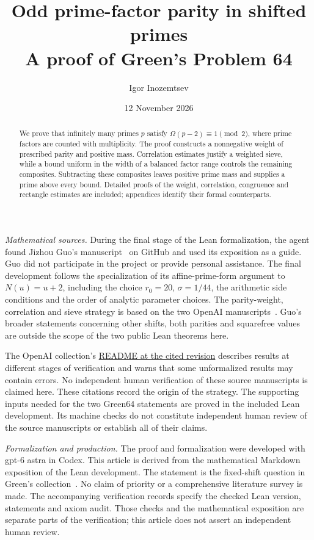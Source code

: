 \documentclass[11pt,a4paper]{article}
\title{Odd prime-factor parity in shifted primes\\[0.3em]
  \large A proof of Green's Problem 64}
\author{Igor Inozemtsev}
\date{12 November 2026}
\begin{document}
\maketitle
\begin{abstract}
We prove that infinitely many primes $p$ satisfy $\Omega(p-2)\equiv1\pmod2$,
where prime factors are counted with multiplicity. The proof constructs a
nonnegative weight of prescribed parity and positive mass. Correlation
estimates justify a weighted sieve, while a bound uniform in the width of a
balanced factor range controls the remaining composites. Subtracting these
composites leaves positive prime mass and supplies a prime above every bound.
Detailed proofs of the weight, correlation, congruence and rectangle estimates are included;
appendices identify their formal counterparts.
\end{abstract}

\noindent\textit{Mathematical sources.}
During the final stage of the Lean formalization, the agent found Jizhou
Guo's manuscript~\cite{guo} on GitHub and used its exposition as a guide.
Guo did not participate in the project or provide personal assistance.
The final development follows the specialization
of its affine-prime-form argument to $N(u)=u+2$, including the choice
$r_0=20$, $\sigma=1/44$, the arithmetic side conditions and the order of
analytic parameter choices. The parity-weight, correlation and sieve
strategy is based on the two OpenAI manuscripts~\cite{openai-e,openai-s}.
Guo's broader statements concerning other shifts, both parities and
squarefree values are outside the scope of the two public Lean theorems here.

The OpenAI collection's
\href{https://github.com/openai/math/blob/adc7f1241b42e322a6451854ab7e4b4c146bf78a/README.md}{README at the cited revision}
describes results at different stages of verification and warns that some
unformalized results may contain errors. No independent human verification
of these source manuscripts is claimed here. These citations record the
origin of the strategy. The supporting inputs needed for the two Green64
statements are proved in the included Lean development. Its machine checks
do not constitute independent human review of the source manuscripts or
establish all of their claims.

\noindent\textit{Formalization and production.}
The proof and formalization were developed with gpt-6 astra in Codex.
This article is derived from the mathematical
Markdown exposition of the Lean development. The statement is the fixed-shift
question in Green's collection~\cite[Problem 64]{green}. No claim of priority
or a comprehensive literature survey is made. The accompanying verification
records specify the checked Lean version, statements and axiom audit.
Those checks and the mathematical exposition are separate parts of the
verification; this article does not assert an independent human review.
\end{document}
